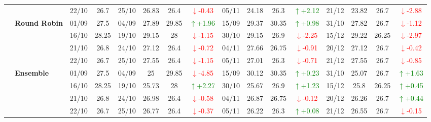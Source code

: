 {\begin{longtable}{llcc|cccc|cccc|cccc}
&
& 22/10 & 26.7 & 25/10 & 26.83 & 26.4 & \textcolor{red}{\(\downarrow\)-0.43} & 05/11 & 24.18 & 26.3 & \textcolor{green}{\(\uparrow\)+2.12} & 21/12 & 23.82 & 26.7 & \textcolor{red}{\(\downarrow\)-2.88} \\
\cmidrule(lr){2-16}


& \textbf{Round Robin}
& 01/09 & 27.5 & 04/09 & 27.89 & 29.85 & \textcolor{green}{\(\uparrow\)+1.96} & 15/09 & 29.37 & 30.35 & \textcolor{green}{\(\uparrow\)+0.98} & 31/10 & 27.82 & 26.7 & \textcolor{red}{\(\downarrow\)-1.12} \\

& 
& 16/10 & 28.25 & 19/10 & 29.15 & 28 & \textcolor{red}{\(\downarrow\)-1.15} & 30/10 & 29.15 & 26.9 & \textcolor{red}{\(\downarrow\)-2.25} & 15/12 & 29.22 & 26.25 & \textcolor{red}{\(\downarrow\)-2.97} \\

& 
& 21/10 & 26.8 & 24/10 & 27.12 & 26.4 & \textcolor{red}{\(\downarrow\)-0.72} & 04/11 & 27.66 & 26.75 & \textcolor{red}{\(\downarrow\)-0.91} & 20/12 & 27.12 & 26.7 & \textcolor{red}{\(\downarrow\)-0.42} \\

&
& 22/10 & 26.7 & 25/10 & 27.55 & 26.4 & \textcolor{red}{\(\downarrow\)-1.15} & 05/11 & 27.01 & 26.3 & \textcolor{red}{\(\downarrow\)-0.71} & 21/12 & 27.55 & 26.7 & \textcolor{red}{\(\downarrow\)-0.85} \\
\cmidrule(lr){2-16}


& \textbf{Ensemble}
& 01/09 & 27.5 & 04/09 & 25 & 29.85& \textcolor{red}{\(\downarrow\)-4.85} & 15/09 & 30.12 & 30.35 & \textcolor{green}{\(\uparrow\)+0.23} & 31/10 & 25.07 & 26.7 & \textcolor{green}{\(\uparrow\)+1.63} \\

& 
& 16/10 & 28.25 & 19/10 & 25.73 & 28 & \textcolor{green}{\(\uparrow\)+2.27} & 30/10 & 25.67 & 26.9 & \textcolor{green}{\(\uparrow\)+1.23} & 15/12 & 25.8 & 26.25 & \textcolor{green}{\(\uparrow\)+0.45} \\

& 
& 21/10 & 26.8 & 24/10 & 26.98 & 26.4 & \textcolor{red}{\(\downarrow\)-0.58} & 04/11 & 26.87 & 26.75 & \textcolor{red}{\(\downarrow\)-0.12} & 20/12 & 26.26 & 26.7 & \textcolor{green}{\(\uparrow\)+0.44} \\

&
& 22/10 & 26.7 & 25/10 & 26.77 & 26.4 & \textcolor{red}{\(\downarrow\)-0.37} & 05/11 & 26.22 & 26.3 & \textcolor{green}{\(\uparrow\)+0.08} & 21/12 & 26.55 & 26.7 & \textcolor{red}{\(\downarrow\)-0.15} \\
\midrule




\end{longtable}}

